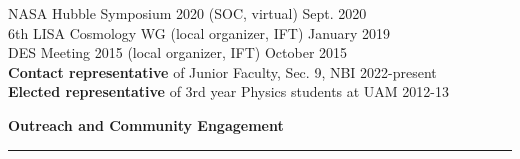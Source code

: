 \documentclass[11pt,a4paper]{article}
\newcommand{\secsizesmall}{0.05\linewidth}
\newcommand{\contsizelong}{0.95\linewidth}
\newcommand{\sectionsep}{12pt}
\begin{document}
\begin{minipage}[t]{\contsizelong}
\begin{flushleft}
NASA Hubble Symposium 2020 (SOC, virtual) \hfill Sept. 2020 \\
6th LISA Cosmology WG (local organizer, IFT) \hfill January 2019 \\
DES Meeting 2015 (local organizer, IFT) \hfill October 2015 \\
\vspace{5pt}
\textbf{Contact representative} of Junior Faculty, Sec. 9, NBI  \hfill 2022-present \\
\textbf{Elected representative} of 3rd year Physics students at UAM  \hfill 2012-13
\end{flushleft}
\end{minipage}

\newpage
\vspace{\sectionsep}
\textbf{Outreach and Community Engagement} \vspace{-8pt}\\ {\rule{\linewidth}{0.6pt}}\vspace{5pt}\\
\begin{minipage}[t]{\secsizesmall}
\begin{flushleft}
\end{flushleft}
\end{minipage}
\end{document}
